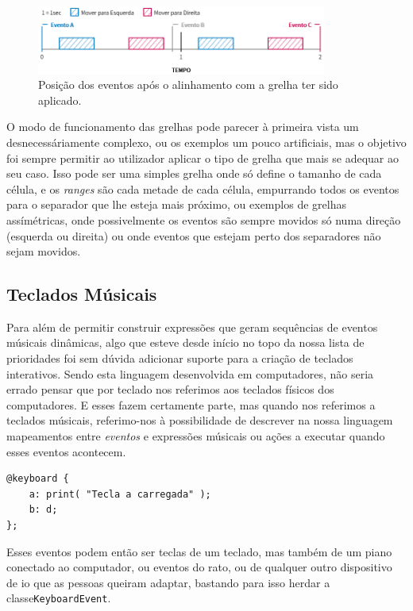 \begin{figure}[h]
\begin{center}
    \includegraphics[width=0.85\textwidth]{img/grids_3_2.png}
\end{center}
\vspace*{-5mm}
\caption{Posição dos eventos após o alinhamento com a grelha ter sido aplicado.}
\label{fig:grids-3-2}
\end{figure}

O modo de funcionamento das grelhas pode parecer à primeira vista um desnecessáriamente complexo, ou os exemplos um pouco artificiais, mas o objetivo foi sempre permitir ao utilizador aplicar o tipo de grelha que mais se adequar ao seu caso. Isso pode ser uma simples grelha onde só define o tamanho de cada célula, e os \textit{ranges} são cada metade de cada célula, empurrando todos os eventos para o separador que lhe esteja mais próximo, ou exemplos de grelhas assímétricas, onde possivelmente os eventos são sempre movidos só numa direção (esquerda ou direita) ou onde eventos que estejam perto dos separadores não sejam movidos.

\subsection{Teclados Músicais}
Para além de permitir construir expressões que geram sequências de eventos músicais dinâmicas, algo que esteve desde início no topo da nossa lista de prioridades foi sem dúvida adicionar suporte para a criação de teclados interativos. Sendo esta linguagem desenvolvida em computadores, não seria errado pensar que por teclado nos referimos aos teclados físicos dos computadores. E esses fazem certamente parte, mas quando nos referimos a teclados músicais, referimo-nos à possibilidade de descrever na nossa linguagem mapeamentos entre \textit{eventos} e expressões músicais ou ações a executar quando esses eventos acontecem.

\begin{lstlisting}[caption={Exemplo de declaração de duas teclas}]
@keyboard {
    a: print( "Tecla a carregada" );
    b: d;
};
\end{lstlisting}

Esses eventos podem então ser teclas de um teclado, mas também de um piano conectado ao computador, ou eventos do rato, ou de qualquer outro dispositivo de \acrshort{io} que as pessoas queiram adaptar, bastando para isso herdar a classe\texttt{KeyboardEvent}.

